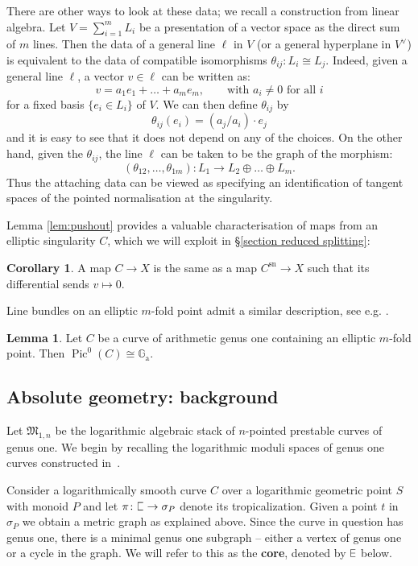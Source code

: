 \documentclass[11pt]{amsart}
\DeclareRobustCommand{\plE}{\text{\reflectbox{$\exists$}}}
\newcommand{\plC}{\scalebox{0.8}[1.3]{$\sqsubset$}}
\renewcommand{\to}{\rightarrow}
\theoremstyle{definition}
\newtheorem{lemma}[thm]{Lemma}
\newtheorem{cor}[thm]{Corollary}
\theoremstyle{definition}
\begin{document}
There are other ways to look at these data; we recall a construction from linear algebra. Let $V=\sum_{i=1}^mL_i$ be a presentation of a vector space as the direct sum of $m$ lines. Then the data of a general line $\ell$ in $V$ (or a general hyperplane in $V^\vee$) is equivalent to the data of compatible isomorphisms $\theta_{ij} \colon L_i \cong L_j$. Indeed, given a general line $\ell$, a vector $v\in\ell$ can be written as:
\[v=a_1e_1+\ldots+a_me_m,\qquad \text{with $a_i\neq 0$ for all $i$}\]
for a fixed basis $\{e_i\in L_i\}$ of $V$. We can then define $\theta_{ij}$ by
\[\theta_{ij}(e_i)=(a_j/a_i)\cdot e_j\]
and it is easy to see that it does not depend on any of the choices. On the other hand, given the $\theta_{ij}$, the line $\ell$ can be taken to be the graph of the morphism:
\[(\theta_{12},\ldots,\theta_{1m})\colon L_1\to L_2\oplus\ldots\oplus L_m.\]
Thus the attaching data can be viewed as specifying an identification of tangent spaces of the pointed normalisation at the singularity.

Lemma \ref{lem:pushout} provides a valuable characterisation of maps from an elliptic singularity $C$, which we will exploit in \S \ref{section reduced splitting}:
\begin{cor}\label{cor:maps_from_elliptic_sing}
 A map $C\to X$ is the same as a map $C^\text{sn}\to X$ such that its differential sends $v \mapsto 0$.
\end{cor}
\noindent Line bundles on an elliptic $m$-fold point admit a similar description, see e.g. \cite[Lemma 7.5.12]{LiuQ}.
\begin{lemma}\label{lem:PicE}
 Let $C$ be a curve of arithmetic genus one containing an elliptic $m$-fold point. Then $\operatorname{Pic}^0(C)\cong\mathbb G_{\text{a}}$.
\end{lemma}


\subsection{Absolute geometry: background} Let $\mathfrak M_{1,n}$ be the logarithmic algebraic stack of $n$-pointed prestable curves of genus one. We begin by recalling the logarithmic moduli spaces of genus one curves constructed in~\cite[\S 2 \& \S 4]{RSPW}. 

Consider a logarithmically smooth curve $C$ over a logarithmic geometric point $S$ with monoid $P$ and let $\pi\colon \plC\to \sigma_P$ denote its tropicalization. Given a point $t$ in $\sigma_P$ we obtain a metric graph as explained above. Since the curve in question has genus one, there is a minimal genus one subgraph -- either a vertex of genus one or a cycle in the graph. We will refer to this as the \textbf{core}, denoted by $\plE$ below.
\end{document}
